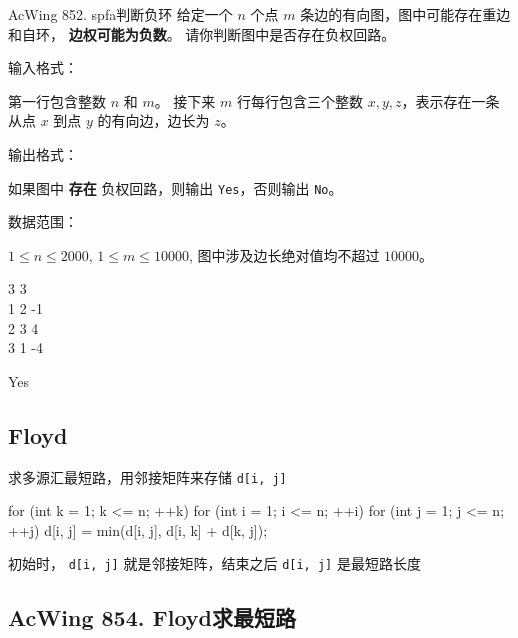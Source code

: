 \begin{titledbox}{AcWing 852. spfa判断负环}
    给定一个 $n$ 个点 $m$ 条边的有向图，图中可能存在重边和自环， \textbf{边权可能为负数}。 请你判断图中是否存在负权回路。

    输入格式：

    第一行包含整数 $n$ 和 $m$。 接下来 $m$ 行每行包含三个整数 $x,y,z$，表示存在一条从点 $x$ 到点 $y$ 的有向边，边长为 $z$。

    输出格式：

    如果图中 \textbf{存在} 负权回路，则输出 \lstinline{Yes}，否则输出 \lstinline{No}。

    数据范围：

    $1 \le n \le 2000$, $1 \le m \le 10000$, 图中涉及边长绝对值均不超过 $10000$。

    \begin{inputblock}
        3 3 \\
        1 2 -1 \\
        2 3 4 \\
        3 1 -4
    \end{inputblock}
    \begin{outputblock}
        Yes
    \end{outputblock}
\end{titledbox}

\subsection{Floyd}
求多源汇最短路，用邻接矩阵来存储 \lstinline{d[i, j]}

\begin{mycpponecol}[Floyd算法]
    for (int k = 1; k <= n; ++k) {
        for (int i = 1; i <= n; ++i) {
            for (int j = 1; j <= n; ++j) {
                d[i, j] = min(d[i, j], d[i, k] + d[k, j]);
            }
        }
    }
\end{mycpponecol}

初始时， \lstinline{d[i, j]} 就是邻接矩阵，结束之后 \lstinline{d[i, j]} 是最短路长度

\subsection{AcWing 854. Floyd求最短路}

